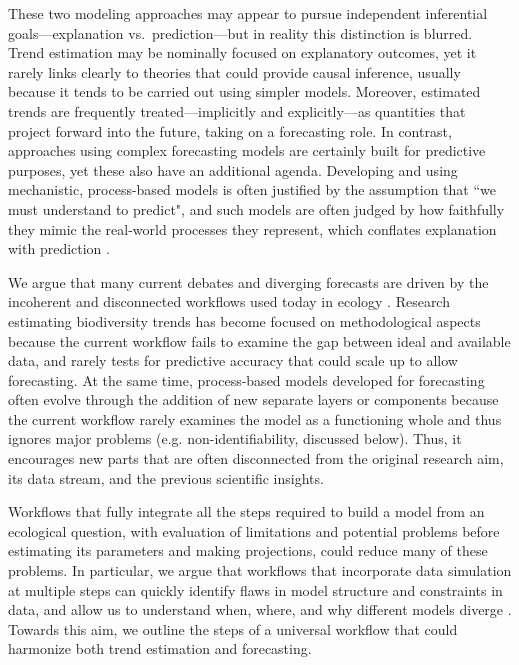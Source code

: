 \documentclass[11pt]{article}
\newcommand{\llabel}[1]{\hypertarget{lintarget:#1}{}\linelabel{lin:#1}}
\begin{document}
\llabel{inferentialgoal}These two modeling approaches may appear to pursue independent inferential goals---explanation vs.\ prediction---but in reality this distinction is blurred. Trend estimation may be nominally focused on explanatory outcomes, yet it rarely links clearly to theories that could provide causal inference, usually because it tends to be carried out using simpler models. Moreover,  estimated trends are frequently treated---implicitly and explicitly---as quantities that project forward into the future, taking on a forecasting role. 
In contrast, approaches using complex forecasting models are certainly built for predictive purposes, yet these also have an additional agenda. Developing and using mechanistic, process-based models is often justified by the assumption that ``we must understand to predict", and such models are often judged by how faithfully they mimic the real-world processes they represent, which conflates explanation with prediction \citep{Shmueli2010}.

We argue that many current debates and diverging forecasts are driven by the incoherent and disconnected workflows used today in ecology \citep{Loreau2022, Talis2023, Johnson2024}. Research estimating biodiversity trends has become focused on methodological aspects because the current workflow fails to examine the gap between ideal and available data, and rarely tests for predictive accuracy that could scale up to allow forecasting. At the same time, process-based models developed for forecasting often evolve through the addition of new separate layers or components because the current workflow rarely examines the model as a functioning whole and thus ignores major problems (e.g. non-identifiability, discussed below). Thus, it encourages new parts that are often disconnected from the original research aim, its data stream, and the previous scientific insights. 

Workflows that fully integrate all the steps required to build a model from an ecological question, with evaluation of limitations and potential problems before estimating its parameters and making projections, could reduce many of these problems. In particular, we argue that workflows that incorporate data simulation at multiple steps can quickly identify flaws in model structure and constraints in data, and allow us to understand when, where, and why different models diverge \citep{McElreath2018, betanworkflow,Gelman2020,Schad2020,grinsztajn2021,vandeschoot2021,Wolkovich2024}. Towards this aim, we outline the steps of a universal workflow that could harmonize both trend estimation and forecasting.
\end{document}
